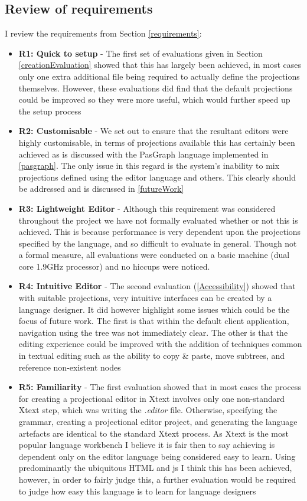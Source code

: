 \documentclass{article}
\begin{document}
\subsection{Review of requirements}
I review the requirements from Section \ref{requirements}:
\begin{itemize}
\item{\textbf{R1: Quick to setup} - The first set of evaluations given in Section \ref{creationEvaluation} showed that this has largely been achieved, in most cases only one extra additional file being required to actually define the projections themselves. However, these evaluations did find that the default projections could be improved so they were more useful, which would further speed up the setup process}
\item{\textbf{R2: Customisable} - We set out to ensure that the resultant editors were highly customisable, in terms of projections available this has certainly been achieved as is discussed with the PasGraph language implemented in \ref{pasgraph}. The only issue in this regard is the system's inability to mix projections defined using the editor language and others. This clearly should be addressed and is discussed in \ref{futureWork}  }
\item{\textbf{R3: Lightweight Editor} - Although this requirement was considered throughout the project we have not formally evaluated whether or not this is achieved. This is because performance is very dependent upon the projections specified by the language, and so difficult to evaluate in general. Though not a formal measure, all evaluations were conducted on a basic machine (dual core 1.9GHz processor) and no hiccups were noticed. }
\item{\textbf{R4: Intuitive Editor} - The second evaluation (\ref{Accessibility}) showed that with suitable projections, very intuitive interfaces can be created by a language designer. It did however highlight some issues which could be the focus of future work. The first is that within the default client application, navigation using the tree was not immediately clear. The other is that the editing experience could be improved with the addition of techniques common in textual editing such as the ability to copy \& paste, move subtrees, and reference non-existent nodes}
\item{\textbf{R5: Familiarity} - The first evaluation showed that in most cases the process for creating a projectional editor in Xtext involves only one non-standard Xtext step, which was writing the \emph{.editor} file. Otherwise, specifying the grammar, creating a projectional editor project, and generating the language artefacts are identical to the standard Xtext process. As Xtext is the most popular language workbench I believe it is fair then to say achieving \RFamiliarity is dependent only on the editor language being considered easy to learn. Using predominantly the ubiquitous HTML and js I think this has been achieved, however, in order to fairly judge this, a further evaluation would be required to judge how easy this language is to learn for language designers}
\end{itemize}
\end{document}
